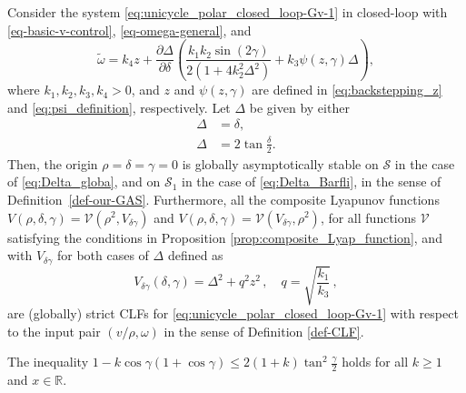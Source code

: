 \documentclass[10pt,a4paper]{amsart}
\begin{document}
\begin{theorem}
\label{thm:backstepping_theorem}
Consider the system \eqref{eq:unicycle_polar_closed_loop-Gv-1} in closed-loop with \eqref{eq-basic-v-control}, \eqref{eq-omega-general}, and 
\begin{equation}
\tilde\omega = k_4 z + \dfrac{\partial \Delta}{\partial \delta} \left( \frac{k_1k_2 \sin(2\gamma)}{2(1+4k_2^2 \Delta^2)} + k_3 \psi(z,\gamma)\Delta \right),
\label{eq:backstepping_controllers}
\end{equation}
where $k_1,k_2,k_3,k_4 > 0$, and $z$ and $\psi(z,\gamma)$ are defined in \eqref{eq:backstepping_z} and \eqref{eq:psi_definition}, respectively. Let $\Delta$ be given by either
\begin{align}
\Delta &= \delta, \label{eq:Delta_globa} \\
\Delta &= 2 \tan \frac{\delta}{2}. \label{eq:Delta_Barfli}
\end{align}
Then, the origin $\rho = \delta = \gamma = 0$ is globally asymptotically stable on $\mathcal{S}$ in the case of \eqref{eq:Delta_globa}, and on $\mathcal{S}_1$ in the case of \eqref{eq:Delta_Barfli}, in the sense of Definition~\ref{def-our-GAS}.
Furthermore, all the composite Lyapunov functions $V(\rho, \delta, \gamma) = \mathcal{V}(\rho^2, V_{\delta \gamma})$ and $V(\rho, \delta, \gamma) = \mathcal{V}(V_{\delta \gamma},\rho^2)$, for all functions $\mathcal{V}$ satisfying the conditions in Proposition \ref{prop:composite_Lyap_function}, and with $V_{\delta \gamma}$ for both cases of $\Delta$ defined as
\begin{equation}
\label{eq:V_CLF_backstepping}
V_{\delta \gamma}(\delta, \gamma) = 
\Delta^2 + q^2z^2\,, \quad q = \sqrt{\frac{k_1}{k_3}}\,,
\end{equation}
are (globally) strict CLFs for \eqref{eq:unicycle_polar_closed_loop-Gv-1} with respect to the input pair $(v/\rho,\omega)$ in the sense of Definition \ref{def-CLF}. 
\end{theorem}

\begin{lemma}\label{lemma:sinterm_upperbound}
The inequality $1- k \cos\gamma(1+\cos\gamma) \leq 2 (1 + k)  \tan^2\frac{\gamma}{2}$ holds for all $k\geq 1$ and $x\in\mathbb{R}$.
\end{lemma}
\end{document}
